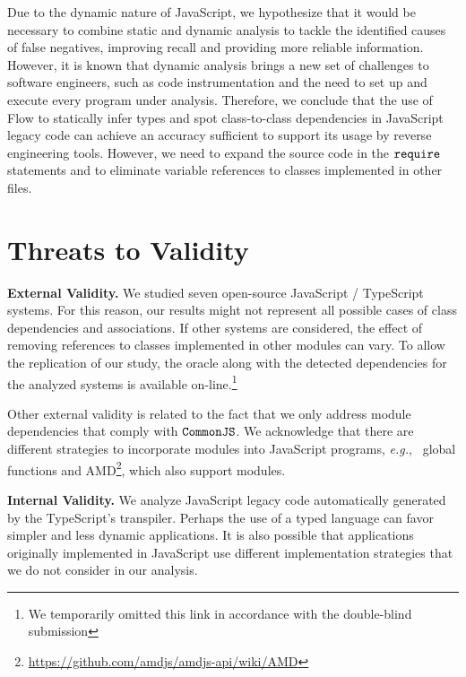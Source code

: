 \documentclass[review]{elsarticle}
\newcommand{\mcode}[1]{$\tt #1$}
\begin{document}
Due to the dynamic nature of JavaScript, we hypothesize that it would be necessary to combine static and dynamic analysis to tackle the identified causes of false negatives, improving recall and providing more reliable information. However, it is known that dynamic analysis brings a new set of challenges to software engineers, such as code instrumentation and the need to set up and execute every program under analysis. Therefore, we conclude that the use of Flow to statically infer types and spot class-to-class dependencies in JavaScript legacy code can achieve an accuracy sufficient to support its usage by reverse engineering tools. However, we need to expand the source code in the \mcode{require} statements and to eliminate variable references to classes implemented in other files.



\section{Threats to Validity}
\label{sec:threats}

\noindent \textbf{External Validity.} We studied seven open-source JavaScript / TypeScript systems. For this reason, our results might not represent all possible cases of class dependencies and associations. If other systems are considered, the effect of removing references to classes implemented in other modules can vary. To allow the replication of our study, the oracle along with the detected dependencies for the analyzed systems is available on-line.\footnote{We temporarily omitted this link in accordance with the double-blind submission}

Other external validity is related to the fact that we only address module dependencies that comply with \mcode{CommonJS}. We acknowledge that there are different strategies to incorporate modules into JavaScript programs, \emph{e.g.},~ global functions and AMD\footnote{\url{https://github.com/amdjs/amdjs-api/wiki/AMD}}, which also support modules.

\vspace{1.5 mm}

\noindent \textbf{Internal Validity.} We analyze JavaScript legacy code automatically generated by the TypeScript's transpiler. Perhaps the use of a typed language can favor simpler and less dynamic applications. It is also possible that applications originally implemented in JavaScript use different implementation strategies that we do not consider in our analysis. 
\end{document}
